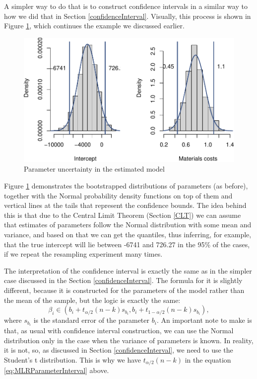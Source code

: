 \documentclass[
]{book}
\theoremstyle{definition}
\theoremstyle{definition}
\theoremstyle{definition}
\theoremstyle{definition}
\theoremstyle{remark}
\begin{document}
A simpler way to do that is to construct confidence intervals in a similar way to how we did that in Section \ref{confidenceInterval}. Visually, this process is shown in Figure \ref{fig:costsModelMLRCI}, which continues the example we discussed earlier.

\begin{figure}
\centering
\includegraphics{Svetunkov---Statistics-for-Business-Analytics_files/figure-latex/costsModelMLRCI-1.pdf}
\caption{\label{fig:costsModelMLRCI}Parameter uncertainty in the estimated model}
\end{figure}

Figure \ref{fig:costsModelMLRCI} demonstrates the bootstrapped distributions of parameters (as before), together with the Normal probability density functions on top of them and vertical lines at the tails that represent the confidence bounds. The idea behind this is that due to the Central Limit Theorem (Section \ref{CLT}) we can assume that estimates of parameters follow the Normal distribution with some mean and variance, and based on that we can get the quantiles, thus inferring, for example, that the true intercept will lie between -6741 and 726.27 in the 95\% of the cases, if we repeat the resampling experiment many times.

The interpretation of the confidence interval is exactly the same as in the simpler case discussed in the Section \ref{confidenceInterval}. The formula for it is slightly different, because it is constructed for the parameters of the model rather than the mean of the sample, but the logic is exactly the same:
\begin{equation}
\beta_i \in (b_i + t_{\alpha/2}(n-k) s_{b_i}, b_i + t_{1-\alpha/2}(n-k) s_{b_i}),
\label{eq:MLRParameterInterval}
\end{equation}
where \(s_{b_i}\) is the standard error of the parameter \(b_i\). An important note to make is that, as usual with confidence interval construction, we can use the Normal distribution only in the case when the variance of parameters is known. In reality, it is not, so, as discussed in Section \ref{confidenceInterval}, we need to use the Student's t distribution. This is why we have \(t_{\alpha/2}(n-k)\) in the equation \eqref{eq:MLRParameterInterval} above.
\end{document}
